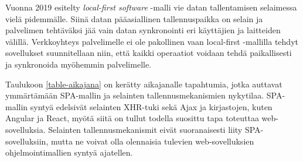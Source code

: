 \documentclass[finnish,twoside,censored,csm,sw-track-2018]{HYthesisML}
\begin{document}
Vuonna 2019 esitelty \citep{local-first} \textit{local-first software} -malli vie datan tallentamisen selaimessa vielä pidemmälle. Siinä datan pääasiallinen tallennuspaikka on selain ja palvelimen tehtäväksi jää vain datan synkronointi eri käyttäjien ja laitteiden välillä. Verkkoyhteys palvelimelle ei ole pakollinen vaan local-first -mallilla tehdyt sovellukset suunnitellaan niin, että kaikki operaatiot voidaan tehdä paikallisesti ja synkronoida myöhemmin palvelimelle.

Taulukoon \ref{table-aikajana} on kerätty aikajanalle tapahtumia, jotka auttavat ymmärtämään SPA-mallin ja selainten tallennusmekanismien nykytilaa. SPA-mallin syntyä edelsivät selainten XHR-tuki sekä Ajax ja kirjastojen, kuten Angular ja React, myötä siitä on tullut todella suosittu tapa toteuttaa web-sovelluksia. Selainten tallennusmekanismit eivät suoranaisesti liity SPA-sovelluksiin, mutta ne voivat olla olennaisia tulevien web-sovelluksien ohjelmointimallien syntyä ajatellen.

\clearpage
\end{document}
